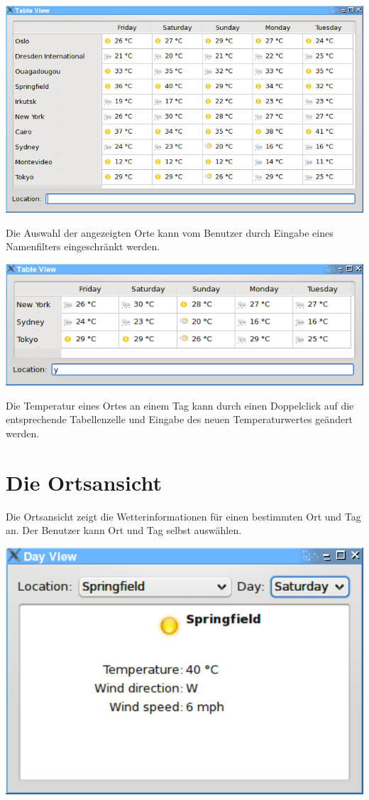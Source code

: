 \documentclass[11pt,a4paper]{scrreprt}
\begin{document}
\begin{center}
\includegraphics[width=14cm]{tableview.png}
\end{center}

Die Auswahl der angezeigten Orte kann vom Benutzer durch Eingabe eines
Namenfilters eingeschränkt werden.

\begin{center}
\includegraphics[width=14cm]{tableview_filtered.png}
\end{center}

Die Temperatur eines Ortes an einem Tag kann durch einen Doppelclick auf
die entsprechende Tabellenzelle und Eingabe des neuen Temperaturwertes
geändert werden.

\section{Die Ortsansicht}
Die Ortsansicht zeigt die Wetterinformationen für einen bestimmten Ort
und Tag an. Der Benutzer kann Ort und Tag selbst auswählen.

\begin{center}
\includegraphics[width=14cm]{dayview.png}
\end{center}
\end{document}
